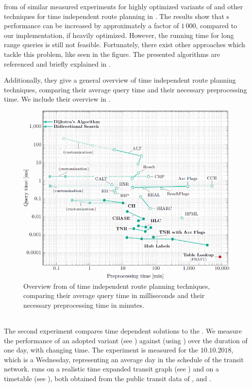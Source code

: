 	from  of similar measured experiments for highly optimized variants of \dijkstra and other
	techniques for \uniModal time independent route planning in .
	The results show that {\dijkstra}s performance can be increased by approximately a factor of $1\,000$, compared to our implementation,
	if heavily optimized. However, the running time for long range queries is still not feasible. Fortunately, there exist other approaches
	which tackle this problem, like seen in the figure. The presented algorithms are referenced and briefly explained in .
	
	Additionally, they give a general overview of \uniModal time independent route planning techniques, comparing their average query time and
	their necessary preprocessing time. We include their overview in .\\
	\begin{figure}[!ht]
		 \begin{center}
			\includegraphics[scale=0.75]{res/uniModalTimeIndependentResultsExternalOverview}
		\end{center}
		\caption{Overview from  of \uniModal time independent route planning
			techniques, comparing their average query time in milliseconds and their necessary preprocessing time in minutes.}
		\label{uniModalTimeIndependentResultsExternalOverview}
	\end{figure}\quad\\
	The second experiment compares time dependent solutions to the \shortestPathProblem. We measure the performance of an
	adopted \dijkstra variant (see ) against \csa (using ) over the duration of one day,
	with changing time. The experiment is measured for the $10.10.2018$, which is a Wednesday, representing an average day in the schedule
	of the transit network. \dijkstra runs on a realistic time expanded transit graph (see ) and \csa on a
	timetable (see ), both obtained from the public transit data of \freiburgR, \stuttgartR and \switzerlandR.
	
